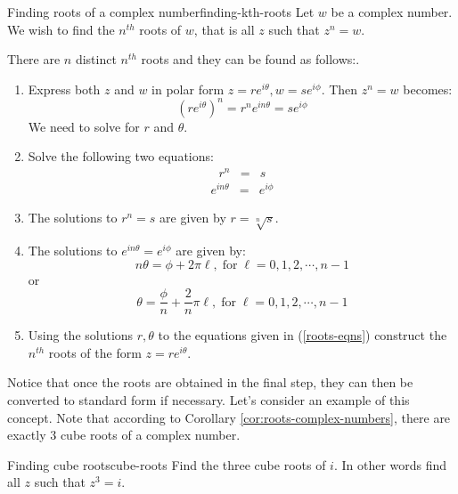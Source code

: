 \begin{procedure}{Finding roots of a complex number}{finding-kth-roots}
Let $w$ be a complex number. We wish to find the $n^{th}$ roots of $w$, that is all $z$ such that $z^n = w$. 

There are $n$ distinct $n^{th}$ roots and they can be found as follows:. 
 
\begin{enumerate}
\item Express both $z$ and $w$ in polar form $z=re^{i\theta}, w=se^{i\phi}$. Then $z^n = w$ becomes:
\[
(re^{i\theta})^n = r^n e^{i n \theta} = se^{i\phi}
\]
We need to solve for $r$ and $\theta$. 
\item Solve the following two equations:
\begin{eqnarray*}
r^n &=& s 
\end{eqnarray*}
\begin{eqnarray}
e^{i n \theta} &=& e^{i \phi}
\label{roots-eqns}
\end{eqnarray}
\item The solutions to $r^n = s$ are given by $r = \sqrt[n]{s}$. 

\item The solutions to $e^{i n \theta} = e^{i \phi}$ are given by:
\[
n\theta = \phi + 2\pi \ell,  \; \mbox{for} \; \ell = 0,1,2, \cdots, n-1
\]
or
\[
\theta = \frac{\phi}{n} + \frac{2}{n} \pi \ell, \; \mbox{for} \; \ell = 0,1,2, \cdots, n-1 
\]
\item
Using the solutions $r, \theta$ to the equations given in (\ref{roots-eqns})
construct the $n^{th}$ roots of the form $z = re^{i\theta}$.  
\end{enumerate}
\end{procedure}

Notice that once the roots are obtained in the final step, they can then be converted to standard form if necessary. Let's consider an example of this concept. Note that according to Corollary \ref{cor:roots-complex-numbers}, 
there are exactly $3$ cube roots of a complex number.

\begin{example}{Finding cube roots}{cube-roots}
Find the three cube roots of $i.$ In other words find all $z$ such that $z^3 = i$. 
\end{example}

